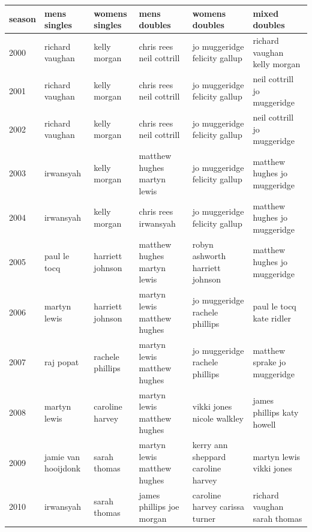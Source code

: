 \documentclass{article}
\begin{document}
\begin{tabular}{llllll}
\toprule
season & mens singles & womens singles & mens doubles & womens doubles & mixed doubles \\
\midrule
2000 & richard vaughan & kelly morgan & chris rees neil cottrill & jo muggeridge felicity gallup & richard vaughan kelly morgan \\
2001 & richard vaughan & kelly morgan & chris rees neil cottrill & jo muggeridge felicity gallup & neil cottrill jo muggeridge \\
2002 & richard vaughan & kelly morgan & chris rees neil cottrill & jo muggeridge felicity gallup & neil cottrill jo muggeridge \\
2003 & irwansyah & kelly morgan & matthew hughes martyn lewis & jo muggeridge felicity gallup & matthew hughes jo muggeridge \\
2004 & irwansyah & kelly morgan & chris rees irwansyah & jo muggeridge felicity gallup & matthew hughes jo muggeridge \\
2005 & paul le tocq & harriett johnson & matthew hughes martyn lewis & robyn ashworth harriett johnson & matthew hughes jo muggeridge \\
2006 & martyn lewis & harriett johnson & martyn lewis matthew hughes & jo muggeridge rachele phillips & paul le tocq kate ridler \\
2007 & raj popat & rachele phillips & martyn lewis matthew hughes & jo muggeridge rachele phillips & matthew sprake jo muggeridge \\
2008 & martyn lewis & caroline harvey & martyn lewis matthew hughes & vikki jones nicole walkley & james phillips katy howell \\
2009 & jamie van hooijdonk & sarah thomas & martyn lewis matthew hughes & kerry ann sheppard caroline harvey & martyn lewis vikki jones \\
2010 & irwansyah & sarah thomas & james phillips joe morgan & caroline harvey carissa turner & richard vaughan sarah thomas \\
\bottomrule
\end{tabular}
\end{document}
